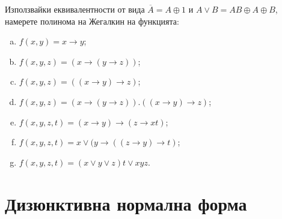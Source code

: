 \begin{problem}
  Използвайки еквивалентности от вида $\overline{A} = A\oplus 1$ и $A\vee B = AB\oplus A\oplus B$, 
  намерете полинома на Жегалкин на функцията:
  \begin{enumerate}[a)]
  \item
    $f(x,y) = x\rightarrow y$;
  \item
    $f(x,y,z) = (x\rightarrow (y\rightarrow z))$;
  \item
    $f(x,y,z) = ((x\rightarrow y)\rightarrow z)$;
  \item
    $f(x,y,z) = (x\rightarrow (y\rightarrow z)).((x\rightarrow y)\rightarrow z)$;
  \item
    $f(x,y,z,t) = (x\rightarrow y)\rightarrow (z\rightarrow xt)$;
  \item
    $f(x,y,z,t) = x\vee (y\rightarrow ((z\rightarrow y)\rightarrow t)$;
  \item
    $f(x,y,z,t) = (x\vee y\vee z)t \vee xyz$.
  \end{enumerate}
\end{problem}


\section{Дизюнктивна нормална форма}

